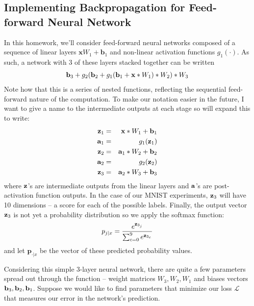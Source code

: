 \documentclass[a4paper,10pt]{article}
\newcommand{\xb}{\mathbf{x}}
\begin{document}
\subsection{Implementing Backpropagation for Feed-forward Neural Network}
In this homework, we'll consider feed-forward neural networks composed of a sequence of linear layers $\mathbf{x}W_1+\mathbf{b}_1$ and non-linear activation functions $g_1(\cdot)$. As such, a network with $3$ of these layers stacked together can be written 
\begin{equation}
\bb_3+g_{2}(\bb_{2}+g_{1}(\mathbf{b}_1+\xb*W_1)*W_{2})*W_3
\end{equation}
Note how that this is a series of nested functions, reflecting the sequential feed-forward nature of the computation.
To make our notation easier in the future, I want to give a name to the intermediate outputs at each stage so will expand this to write:
%
\begin{eqnarray}
\zb_1 &=& \xb*W_1 +\bb_1\\
\ab_1 &=& g_1(\zb_1)\\
\zb_2 &=& \ab_1*W_2 +\bb_2\\
\ab_2 &=& g_2(\zb_2)\\
\zb_3 &=& \ab_2*W_3+\bb_3
\end{eqnarray}
%
where $\mathbf{z}$'s are intermediate outputs from the linear layers and $\mathbf{a}$'s are post-activation function outputs. In the case of our MNIST experiments, $\mathbf{z}_3$ will have 10 dimensions -- a score for each of the possible labels. Finally, the output vector $\mathbf{z}_3$ is not yet a probability distribution so we apply the softmax function:
%
\begin{equation}
    p_{j|x} = \frac{e^{\mathbf{z}_{3_j}}}{\sum_{c=0}^9 e^{\mathbf{z}_{3_c}}}
\end{equation}
%
and let $\mathbf{p}_{\cdot|x}$ be the vector of these predicted probability values.

 Considering this simple 3-layer neural network, there are quite a few parameters spread out through the function -- weight matrices $W_3, W_2, W_1$ and biases vectors $\mathbf{b}_3, \mathbf{b}_2, \mathbf{b}_1$. Suppose we would like to find parameters that minimize our loss $\mathcal{L}$ that measures our error in the network's prediction. 
\end{document}
